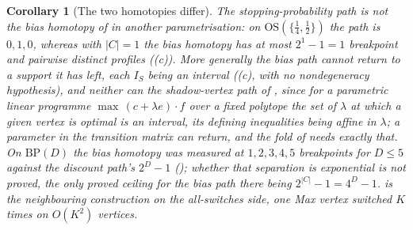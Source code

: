 \documentclass[11pt]{article}
\theoremstyle{plain}
\newtheorem{corollary}[theorem]{Corollary}
\theoremstyle{definition}
\begin{document}
\begin{corollary}[The two homotopies differ]\label{cor:two-homotopies}
The stopping-probability path is not the bias homotopy of 
in another parametrisation: on $\mathrm{OS}(\{\tfrac14,\tfrac12\})$ the path
is $0,1,0$, whereas with $|C|=1$ the bias homotopy has at most $2^{1}-1=1$
breakpoint and pairwise distinct profiles ((c)).
More generally the bias path cannot return to a support it has left, each
$I_S$ being an interval ((c), with no
nondegeneracy hypothesis), and neither can the shadow-vertex path of
, since for a parametric linear programme
$\max\,(c+\lambda e)\cdot f$ over a fixed polytope the set of $\lambda$ at
which a given vertex is optimal is an interval, its defining inequalities
being affine in $\lambda$; a parameter in the transition matrix can return,
and the fold of  needs exactly that. On
$\mathrm{BP}(D)$ the bias homotopy was measured at $1,2,3,4,5$ breakpoints
for $D\le5$ against the discount path's $2^{D}-1$ ();
whether that separation is exponential is not proved, the only proved
ceiling for the bias path there being $2^{|C|}-1=4^{D}-1$.
 is the
neighbouring construction on the all-switches side, one Max vertex
switched $K$ times on $O(K^{2})$ vertices.
\end{corollary}
\end{document}
